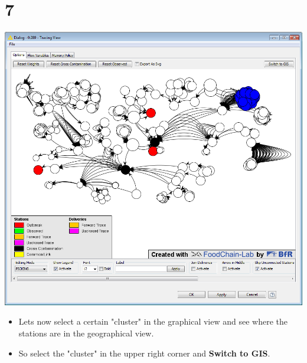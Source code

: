 \documentclass{beamer}
\begin{document}
\section{7}
\begin{frame}
	\begin{center}
  		\includegraphics[height=0.6\textheight]{7.png}
	\end{center}
	\begin{itemize}
		\item Lets now select a certain "cluster" in the graphical view and see where the stations are in the geographical view.
		\item So select the "cluster" in the upper right corner and \textbf{Switch to GIS}.
	\end{itemize}
\end{frame}
\end{document}
